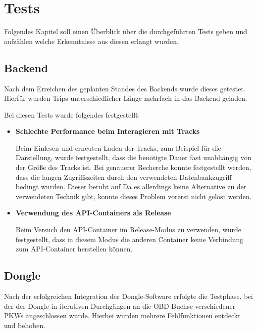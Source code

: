 \chapter{Tests}
\label{sec:test}
Folgendes Kapitel soll einen Überblick über die durchgeführten Tests geben und aufzählen welche Erkenntnisse aus diesen erlangt wurden.

\section{Backend}
Nach dem Erreichen des geplanten Standes des Backends wurde dieses getestet. Hierfür wurden Trips unterschiedlicher Länge mehrfach in das Backend geladen. 

Bei diesen Tests wurde folgendes festgestellt:
\begin{itemize}
	\item \textbf{Schlechte Performance beim Interagieren mit Tracks}
	
	Beim Einlesen und erneuten Laden der Tracks, zum Beispiel für die Darstellung, wurde festgestellt, dass die benötigte Dauer fast unabhängig von der Größe des Tracks ist. Bei genauerer Recherche konnte festgestellt werden, dass die langen Zugriffszeiten durch den verwendeten Datenbankzugriff bedingt wurden. Dieser beruht auf %
	Da es allerdings keine Alternative zu der verwendeten Technik gibt, konnte dieses Problem vorerst nicht gelöst werden.
	
	\item \textbf{Verwendung des \ac{API}-Containers als Release}
	
	Beim Versuch den \ac{API}-Container im Release-Modus zu verwenden, wurde festgestellt, dass in diesem Modus die anderen Container keine Verbindung zum \ac{API}-Container herstellen können. %
	
\end{itemize}

\section{Dongle}
\label{sec:dongleTest}
Nach der erfolgreichen Integration der Dongle-Software erfolgte die Testphase, bei der der Dongle in iterativen Durchgängen an die OBD-Buchse verschiedener PKWs angeschlossen wurde. Hierbei wurden mehrere Fehlfunktionen entdeckt und behoben.
